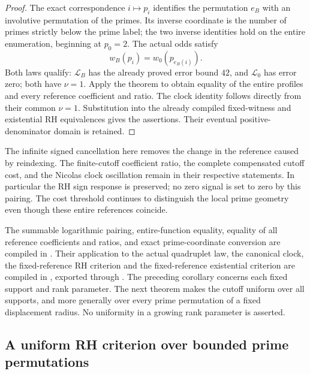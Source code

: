 \documentclass[11pt]{article}
\theoremstyle{definition}
\begin{document}
\begin{proof}
The exact correspondence $i\mapsto p_i$ identifies the permutation
$e_B$ with an involutive permutation of the primes. Its inverse
coordinate is the number of primes strictly below the prime label;
the two inverse identities hold on the entire enumeration, beginning
at $p_0=2$. The actual odds satisfy
\[
 w_B(p_i)=w_0(p_{e_B(i)}).
\]
Both laws qualify: $\mathcal L_B$ has the already proved error bound
$42$, and $\mathcal L_0$ has error zero; both have $\nu=1$.
Apply the theorem to obtain equality of the entire profiles and every
reference coefficient and ratio. The clock identity follows directly
from their common $\nu=1$. Substitution into the already compiled
fixed-witness and existential RH equivalences gives the assertions.
Their eventual positive-denominator domain is retained.
\end{proof}

The infinite signed cancellation here removes the change in the
reference caused by reindexing. The finite-cutoff coefficient ratio,
the complete compensated cutoff cost, and the Nicolas clock oscillation
remain in their respective statements. In particular the RH sign
response is preserved; no zero signal is set to zero by this pairing.
The cost threshold continues to distinguish the local prime geometry
even though these entire references coincide.

\begin{flushleft}
The summable logarithmic pairing, entire-function equality, equality of
all reference coefficients and ratios, and exact prime-coordinate
conversion are compiled in
.
Their application to the actual quadruplet law, the canonical clock,
the fixed-reference RH criterion and the fixed-reference existential
criterion are compiled in
,
exported through .
The preceding corollary concerns each fixed support and rank parameter.
The next theorem makes the cutoff uniform over all supports, and more
generally over every prime permutation of a fixed displacement radius.
No uniformity in a growing rank parameter is asserted.
\end{flushleft}

\subsection{A uniform RH criterion over bounded prime permutations}
\end{document}
